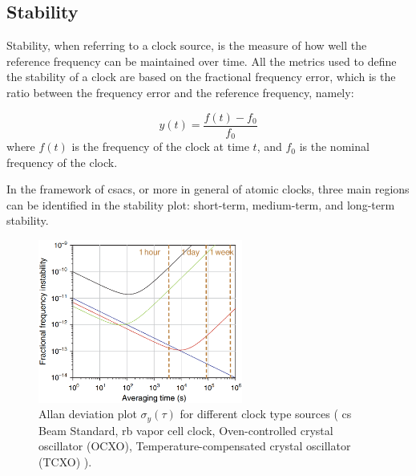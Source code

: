 \subsection{Stability}
\label{subsec:stability}

Stability, when referring to a clock source, is the measure of how well the reference frequency can be maintained over time.
All the metrics used to define the stability of a clock are based on the fractional frequency error, which is the ratio between the frequency error and the reference frequency, namely:

\begin{equation}
  y(t) = \frac{f(t) - f_0}{f_0}
  \label{eq:fractional_frequency_error}
\end{equation}
%
where $f(t)$ is the frequency of the clock at time $t$, and $f_0$ is the nominal frequency of the clock.

In the framework of \acrshort{csacs}, or more in general of atomic clocks, three main regions can be identified in the stability plot: short-term, medium-term, and long-term stability.

\begin{figure}
  \centering
  \includegraphics[width=0.6\textwidth, max width=\linewidth]{img/allan-deviation-graph.png}
  \caption{
    Allan deviation plot $\sigma_y(\tau)$ for different clock type sources
    (
    \textcolor[HTML]{0000FF}{\acrfull{cs} Beam Standard},
    \textcolor[HTML]{FF0000}{\acrfull{rb} vapor cell clock},
    \textcolor[HTML]{00FF00}{Oven-controlled crystal oscillator (OCXO)},
    \textcolor[HTML]{000000}{Temperature-compensated crystal oscillator (TCXO)}
    ).
  }
  \label{fig:allan_deviation_graph}
\end{figure}


